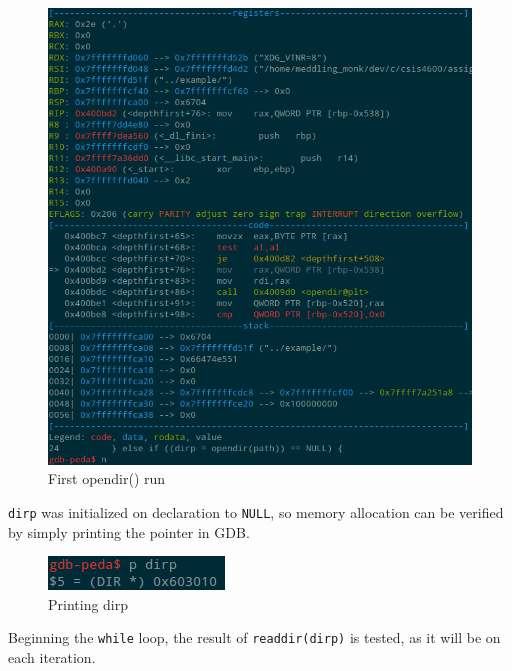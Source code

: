 \documentclass[a4paper,12pt,sffamily]{article}
\begin{document}
\begin{figure}[H]
	\centering
	\includegraphics[width=1\linewidth]{./images/4}
	\caption[First_opendir]{First opendir() run}
	\label{fig:5}
\end{figure}
\texttt{dirp} was initialized on declaration to \texttt{NULL}, so memory allocation can be
verified by simply printing the pointer in GDB.
\begin{figure}[H]
	\centering
	\includegraphics[width=.3\linewidth]{./images/5}
	\caption[print_dirp_pointer]{Printing dirp}
	\label{fig:6}
\end{figure}
Beginning the \texttt{while} loop, the result of \texttt{readdir(dirp)} is tested, as it
will be on each iteration.
\end{document}
